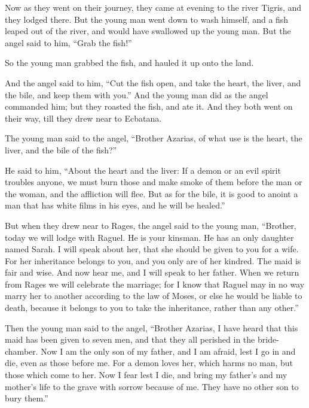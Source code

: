  Now as they went on their journey, they came at evening to
the river Tigris, and they lodged there.  But the young man
went down to wash himself, and a fish leaped out of the river, and would
have swallowed up the young man.  But the angel said to him,
``Grab the fish!''

So the young man grabbed the fish, and hauled it up onto the land.

 And the angel said to him, ``Cut the fish open, and take
the heart, the liver, and the bile, and keep them with you.''
 And the young man did as the angel commanded him; but they
roasted the fish, and ate it. And they both went on their way, till they
drew near to Ecbatana.

 The young man said to the angel, ``Brother Azarias, of what
use is the heart, the liver, and the bile of the fish?''

 He said to him, ``About the heart and the liver: If a demon
or an evil spirit troubles anyone, we must burn those and make smoke of
them before the man or the woman, and the affliction will flee.
 But as for the bile, it is good to anoint a man that has
white films in his eyes, and he will be healed.''

 But when they drew near to Rages,  the angel
said to the young man, ``Brother, today we will lodge with Raguel. He is
your kinsman. He has an only daughter named Sarah. I will speak about
her, that she should be given to you for a wife.  For her
inheritance belongs to you, and you only are of her kindred.
 The maid is fair and wise. And now hear me, and I will
speak to her father. When we return from Rages we will celebrate the
marriage; for I know that Raguel may in no way marry her to another
according to the law of Moses, or else he would be liable to death,
because it belongs to you to take the inheritance, rather than any
other.''

 Then the young man said to the angel, ``Brother Azarias, I
have heard that this maid has been given to seven men, and that they all
perished in the bride-chamber.  Now I am the only son of my
father, and I am afraid, lest I go in and die, even as those before me.
For a demon loves her, which harms no man, but those which come to her.
Now I fear lest I die, and bring my father's and my mother's life to the
grave with sorrow because of me. They have no other son to bury them.''

